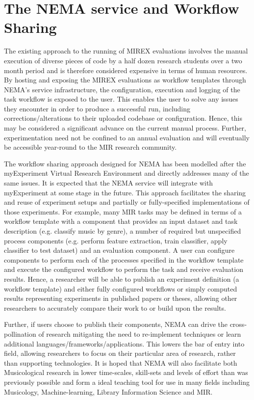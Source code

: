\documentclass[conference]{IEEEtran}
\begin{document}
\section{The NEMA service and Workflow Sharing}
The existing approach to the running of MIREX evaluations involves the manual execution of diverse pieces of code by a half dozen research students over a two month period and is therefore considered expensive in terms of human resources. By hosting and exposing the MIREX evaluations as workflow templates through NEMA's service infrastructure, the configuration, execution and logging of the task workflow is exposed to the user. This enables the user to solve any issues they encounter in order to produce a successful run, including corrections/alterations to their uploaded codebase or configuration. Hence, this may be considered a significant advance on the current manual process.  Further, experimentation need not be confined to an annual evaluation and will eventually be accessible year-round to the MIR research community.

The workflow sharing approach designed for NEMA has been modelled after the myExperiment Virtual Research Environment \cite{de2007designing} and directly addresses many of the same issues. It is expected that the NEMA service will integrate with myExperiment at some stage in the future.  This approach facilitates the sharing and reuse of experiment setups and partially or fully-specified implementations of those experiments. For example, many MIR tasks may be defined in terms of a workflow template with a component that provides an input dataset and task description (e.g. classify music by genre), a number of required but unspecified process components (e.g. perform feature extraction, train classifier, apply classifier to test dataset) and an evaluation component. A user can configure components to perform each of the processes specified in the workflow template and execute the configured workflow to perform the task and receive evaluation results.  Hence, a researcher will be able to publish an experiment definition (a workflow template) and either fully configured workflows or simply computed results representing experiments in published papers or theses, allowing other researchers to accurately compare their work to or build upon the results.

Further, if users choose to publish their components, NEMA can drive the cross-pollination of research mitigating the need to re-implement techniques or learn additional languages/frameworks/applications. This lowers the bar of entry into field, allowing researchers to focus on their particular area of research, rather than supporting technologies. It is hoped that NEMA will also facilitate both Musicological research in lower time-scales, skill-sets and levels of effort than was previously possible and form a ideal teaching tool for use in many fields including Musicology, Machine-learning, Library Information Science and MIR.  
\end{document}
